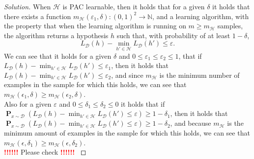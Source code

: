 \documentclass[10pt, a4paper, twoside]{amsart}
\newcommand{\N}{\ensuremath{\mathbb{N}}}
\renewcommand{\P}{\operatorname*{\ensuremath{\mathbf{P}}}} %
\newenvironment{solution}
               {\let\oldqedsymbol=\qedsymbol
                \renewcommand{\qedsymbol}{$\blacktriangleleft$}
                \begin{proof}[Solution]}
               {\end{proof}
                \renewcommand{\qedsymbol}{\oldqedsymbol}}
\newcommand{\TODO}{\textcolor{red}{\textbf{!!!!!! }}}
\begin{document}
\begin{solution}
  When $\mathcal{H}$ is PAC learnable, then it holds that for a given $\delta$ it holds that there exists a function $m_{\mathcal{H}}(\varepsilon_1,\delta ):(0,1)^2 \rightarrow \N$, and a learning algorithm, with the property that when the learning algorithm is running on $m \geq m_{\mathcal{H}}$ samples, the algorithm returns a hypothesis $h$ such that, with probability of at least $1- \delta$,
  \begin{equation*}
    L_{\mathcal{D}}(h) - \min_{h' \in \mathcal{H}} L_{\mathcal{D}}(h')\leq \varepsilon.
  \end{equation*}
  We can see that it holds for a given $\delta$ and $0 \leq \varepsilon_1 \leq \varepsilon_2 \leq 1$, that if\\ $L_{\mathcal{D}}(h) - \min_{h' \in \mathcal{H}} L_{\mathcal{D}}(h') \leq \varepsilon_1$,
  then it holds that\\ 
  $L_{\mathcal{D}}(h) - \min_{h' \in \mathcal{H}} L_{\mathcal{D}}(h')\leq \varepsilon_2$, and since $m_{\mathcal{H}}$ is the minimum number of examples in the sample for which this holds, 
  we can see that $m_{\mathcal{H}}(\epsilon_1, \delta) \geq m_{\mathcal{H}}(\epsilon_2, \delta)$.\\ 
  Also for a given $\varepsilon$ and $0\leq \delta_1 \leq \delta_2 \leq 0$ it holds that if\\ 
  $\P_{x\sim \mathcal{D}}(L_{\mathcal{D}}(h) - \min_{h' \in \mathcal{H}} L_{\mathcal{D}}(h') \leq \varepsilon) \geq 1-\delta_1$, then it holds that\\ 
  $\P_{x\sim \mathcal{D}}(L_{\mathcal{D}}(h) - \min_{h' \in \mathcal{H}} L_{\mathcal{D}}(h') \leq \varepsilon) \geq 1-\delta_2$, and because $m_{\mathcal{H}}$ is the minimum amount of examples in the sample for which this holds, we can see that $m_{\mathcal{H}}(\epsilon, \delta_1) \geq m_{\mathcal{H}}(\epsilon, \delta_2)$.\\

\TODO Please check \TODO
\end{solution}
\end{document}
